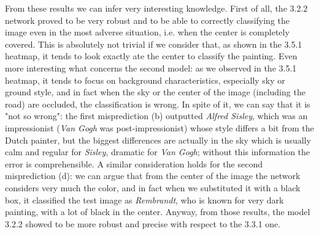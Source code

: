 \medskip

\noindent From these results we can infer very interesting knowledge. First of all, the 3.2.2 network proved to be very robust and to be able to correctly classifying the image even in the most adverse situation, i.e. when the center is completely covered. This is absolutely not trivial if we consider that, as shown in the 3.5.1 heatmap, it tends to look exactly ate the center to classify the painting. Even more interesting what concerns the second model: as we observed in the 3.5.1 heatmap, it tends to focus on background characteristics, especially sky or ground style, and in fact when the sky or the center of the image (including the road) are occluded, the classification is wrong. In spite of it, we can say that it is "not so wrong": the first misprediction (b) outputted \textit{Alfred Sisley}, which was an impressionist (\textit{Van Gogh} was post-impressionist) whose style differs a bit from the Dutch painter, but the biggest differences are actually in the sky which is usually calm and regular for \textit{Sisley}, dramatic for \textit{Van Gogh}; without this information the error is comprehensible. A similar consideration holds for the second misprediction (d): we can argue that from the center of the image the network considers very much the color, and in fact when we substituted it with a black box, it classified the test image as \textit{Rembrandt}, who is known for very dark painting, with a lot of black in the center.
Anyway, from those results, the model 3.2.2 showed to be more robust and precise with respect to the 3.3.1 one. 